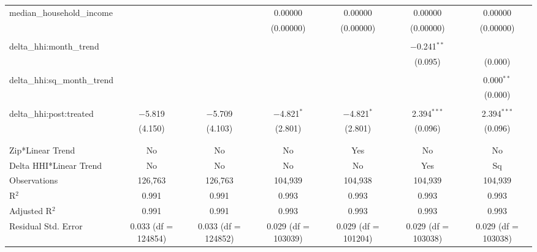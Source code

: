 \begin{table}[H]
{\begin{tabular}{@{\extracolsep{5pt}}lcccccc}
  median\_household\_income &  &  & 0.00000 & 0.00000 & 0.00000 & 0.00000 \\  

   &  &  & (0.00000) & (0.00000) & (0.00000) & (0.00000) \\  

   & & & & & & \\  

  delta\_hhi:month\_trend &  &  &  &  & $-$0.241$^{**}$ &  \\  

   &  &  &  &  & (0.095) & (0.000) \\  

   & & & & & & \\  

  delta\_hhi:sq\_month\_trend &  &  &  &  &  & 0.000$^{**}$ \\  

   &  &  &  &  &  & (0.000) \\  

   & & & & & & \\  

  delta\_hhi:post:treated & $-$5.819 & $-$5.709 & $-$4.821$^{*}$ & $-$4.821$^{*}$ & 2.394$^{***}$ & 2.394$^{***}$ \\  

   & (4.150) & (4.103) & (2.801) & (2.801) & (0.096) & (0.096) \\  

   & & & & & & \\  

 \hline \\[-1.8ex]  

 Zip*Linear Trend & No & No & No & Yes & No & No \\  

 Delta HHI*Linear Trend & No & No & No & No & Yes & Sq \\  

 Observations & 126,763 & 126,763 & 104,939 & 104,938 & 104,939 & 104,939 \\  

 R$^{2}$ & 0.991 & 0.991 & 0.993 & 0.993 & 0.993 & 0.993 \\  

 Adjusted R$^{2}$ & 0.991 & 0.991 & 0.993 & 0.993 & 0.993 & 0.993 \\  

 Residual Std. Error & 0.033 (df = 124854) & 0.033 (df = 124852) & 0.029 (df = 103039) & 0.029 (df = 101204) & 0.029 (df = 103038) & 0.029 (df = 103038) \\  


\end{tabular}}
\end{table}
